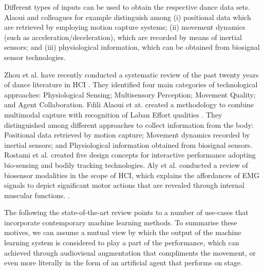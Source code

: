 Different types of inputs can be used to obtain the respective dance data sets. Alaoui and colleagues \cite{fdili2017seeing} for example distinguish among (i) positional data which are retrieved by employing motion capture systems; (ii) movement dynamics (such as acceleration/deceleration), which are recorded by means of inertial sensors; and (iii) physiological information, which can be obtained from biosignal sensor technologies.




Zhou et al. have recently conducted a systematic review of the past twenty years of dance literature in HCI \cite{zhou_dance_2021}. They identified four main categories of technological approaches: Physiological Sensing; Multisensory Perception; Movement Quality; and Agent Collaboration. Fdili Alaoui et at. created a methodology to combine multimodal capture with recognition of Laban Effort qualities \cite{fdili_alaoui_seeing_2017}. They distinguished among different approaches to collect information from the body: Positional data retrieved by motion capture; Movement dynamics recorded by inertial sensors; and Physiological information obtained from biosignal sensors. Rostami et al. \cite{rostami_bio-sensed_2017} created five design concepts for interactive performance adopting bio-sensing and bodily tracking technologies. Aly et al. conducted a review of biosensor modalities in the scope of HCI, which explains the affordances of EMG signals to depict significant motor actions that are revealed through internal muscular functions. \cite{aly_appropriating_2021}.

The following the state-of-the-art review points to a number of use-cases that incorporate contemporary machine learning methods. To summarise these motives, we can assume a mutual view by which the output of the machine learning system is considered to play a part of the performance, which can achieved through audiovisual augmentation that compliments the movement, or even more literally in the form of an artificial agent that performs on stage.

